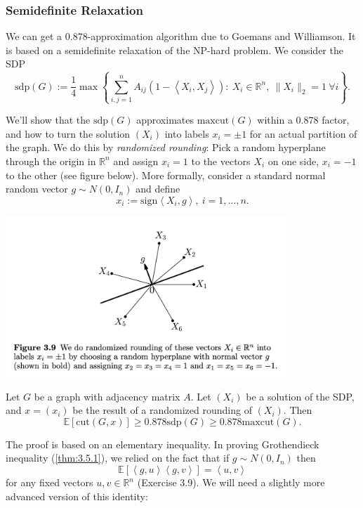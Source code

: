 \subsubsection{Semidefinite Relaxation}
We can get a 0.878-approximation algorithm due to Goemans and Williamson. It is based on a semidefinite 
relaxation of the NP-hard problem. We consider the SDP 
\[ \mathrm{sdp}(G) := \frac{1}{4} \max_{}\left\{ \sum_{i, j = 1}^{n} A_{ij} 
(1 - \left\langle X_i, X_j \right\rangle): \ X_i \in \mathbb{R}^n, \ \lVert X_i \rVert_{2} = 1 \ 
\forall i \right\}. \]

We'll show that the $\mathrm{sdp}(G)$ approximates $\mathrm{maxcut}(G)$ within a 0.878 factor, and how to turn 
the solution $(X_i)$ into labels $x_i = \pm 1$ for an actual partition of the graph. We do this by 
\textit{randomized rounding}: Pick a random hyperplane through the origin in $\mathbb{R}^n$ and assign $x_i = 1$ 
to the vectors $X_i$ on one side, $x_i = -1$ to the other (see figure below). More formally, consider a standard 
normal random vector $g \sim N(0, I_n)$ and define 
\[ x_i := \mathrm{sign}\left\langle X_i, g \right\rangle, \ i = 1, \dots, n. \]

\begin{center}
	\includegraphics[width=0.8\textwidth]{Chapter 3/fig3-9.png}
\end{center}

\begin{theorem}[]
\label{thm:3.6.4}
Let $G$ be a graph with adjacency matrix $A$. Let $(X_i)$ be a solution of the SDP, and $x = (x_i)$ be the 
result of a randomized rounding of $(X_i)$. Then 
\[ \mathbb{E}\left[ \mathrm{cut}(G, x) \right] \geq 0.878 \mathrm{sdp}(G) \geq 0.878 \mathrm{maxcut}(G). \]
\end{theorem}

The proof is based on an elementary inequality. In proving Grothendieck inequality (\cref{thm:3.5.1}), we 
relied on the fact that if $g \sim N(0, I_n)$ then 
\[ \mathbb{E}\left[ \left\langle g, u \right\rangle \left\langle g, v \right\rangle \right] 
= \left\langle u, v \right\rangle \]
for any fixed vectors $u, v \in \mathbb{R}^n$ (Exercise 3.9). We will need a slightly more advanced version of 
this identity:

